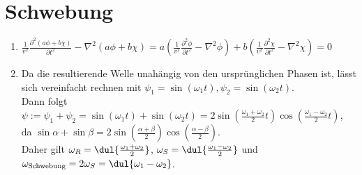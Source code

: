 \documentclass{article}
\begin{document}
\section{Schwebung}
\begin{enumerate}[label=\alph*)]
    \item $\frac{1}{v^2} \frac{\partial^2 (a \phi + b \chi)}{\partial t^2} - \nabla^2 (a \phi + b \chi) 
    = a \left( \frac{1}{v^2} \frac{\partial^2 \phi}{\partial t^2} - \nabla^2 \phi \right) + b \left( \frac{1}{v^2} \frac{\partial^2 \chi}{\partial t^2} - \nabla^2 \chi \right) = 0$
    
    \item Da die resultierende Welle unahängig von den ursprünglichen Phasen ist, lässt sich vereinfacht rechnen  mit $\psi_1 = \sin(\omega_1 t), \psi_2 = \sin(\omega_2 t)$. \\
    Dann folgt $\psi := \psi_1 + \psi_2 = \sin(\omega_1 t) + \sin(\omega_2 t) = 2 \sin\left(\frac{\omega_1 + \omega_2}{2} t\right) \cos\left(\frac{\omega_1 - \omega_2}{2} t\right)$, \\
    da $\sin \alpha + \sin \beta = 2 \sin\left(\frac{\alpha + \beta}{2}\right) \cos\left(\frac{\alpha - \beta}{2}\right)$. \\
    Daher gilt $\omega_R = \dul{\frac{\omega_1 + \omega_2}{2}}$, $\omega_S = \dul{\frac{\omega_1 - \omega_2}{2}}$ und $\omega_\text{Schwebung} = 2 \omega_S = \dul{\omega_1 - \omega_2}$.
\end{enumerate}
\end{document}
